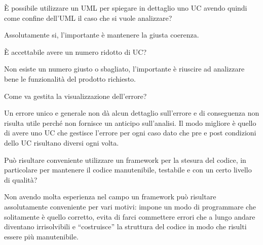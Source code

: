 \begin{itemize}
  \begin{spacing}{3}
  \end{spacing}

  \begin{minipage}[c]{0.47\textwidth}
    \centering
    È possibile utilizzare un UML per spiegare in dettaglio uno UC avendo quindi come confine dell'UML il caso che si vuole analizzare?
  \end{minipage}
  \hfill
  \begin{minipage}[c]{0.47\textwidth}
    \centering
    Assolutamente si, l'importante è mantenere la giusta coerenza.
  \end{minipage}

  \begin{spacing}{3}
  \end{spacing}

  \begin{minipage}[c]{0.47\textwidth}
    \centering
    È accettabile avere un numero ridotto di UC?
  \end{minipage}
  \hfill
  \begin{minipage}[c]{0.47\textwidth}
    \centering
    Non esiste un numero giusto o sbagliato, l'importante è riuscire ad analizzare bene le funzionalità del prodotto richiesto.
  \end{minipage}

  \begin{spacing}{3}
  \end{spacing}

  \begin{minipage}[c]{0.47\textwidth}
    \centering
    Come va gestita la visualizzazione dell'errore?
  \end{minipage}
  \hfill
  \begin{minipage}[c]{0.47\textwidth}
    \centering
    Un errore unico e generale non dà alcun dettaglio sull'errore e di conseguenza non risulta utile perché non fornisce un anticipo sull'analisi. Il modo migliore è quello di avere uno UC che gestisce l'errore per ogni caso dato che pre e post condizioni dello UC risultano diversi ogni volta.
  \end{minipage}

  \begin{spacing}{3}
  \end{spacing}

  \begin{minipage}[c]{0.47\textwidth}
    \centering
    Può risultare conveniente utilizzare un framework per la stesura del codice, in particolare per mantenere il codice manutenibile, testabile e con un certo livello di qualità?
  \end{minipage}
  \hfill
  \begin{minipage}[c]{0.47\textwidth}
    \centering
    Non avendo molta esperienza nel campo un framework può risultare assolutamente conveniente per vari motivi: impone un modo di programmare che solitamente è quello corretto, evita di farci commettere errori che a lungo andare diventano irrisolvibili e ``costruisce'' la struttura del codice in modo che risulti essere più manutenibile.
  \end{minipage}


\end{itemize}
